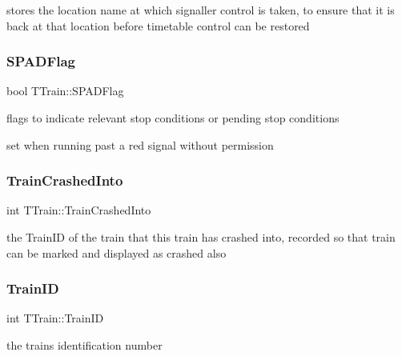 stores the location name at which signaller control is taken, to ensure that it is back at that location before timetable control can be restored \mbox{\label{class_t_train_a05383ce005a22df0cb70df7f31a917cf}} 
\subsubsection{\texorpdfstring{S\+P\+A\+D\+Flag}{SPADFlag}}
{\footnotesize\ttfamily bool T\+Train\+::\+S\+P\+A\+D\+Flag\hspace{0.3cm}{\ttfamily [private]}}



flags to indicate relevant stop conditions or pending stop conditions 

set when running past a red signal without permission \mbox{\label{class_t_train_ad7644b30da32d0d9e6541ba7629a4a35}} 
\subsubsection{\texorpdfstring{Train\+Crashed\+Into}{TrainCrashedInto}}
{\footnotesize\ttfamily int T\+Train\+::\+Train\+Crashed\+Into\hspace{0.3cm}{\ttfamily [private]}}

the Train\+ID of the train that this train has crashed into, recorded so that train can be marked and displayed as crashed also \mbox{\label{class_t_train_a95a26f26e890d53e38f1f8067977ef0e}} 
\subsubsection{\texorpdfstring{Train\+ID}{TrainID}}
{\footnotesize\ttfamily int T\+Train\+::\+Train\+ID\hspace{0.3cm}{\ttfamily [private]}}

the train\textquotesingle{}s identification number \mbox{\label{class_t_train_ae57749c241ad7256c6f628faf1168ce7}} 
